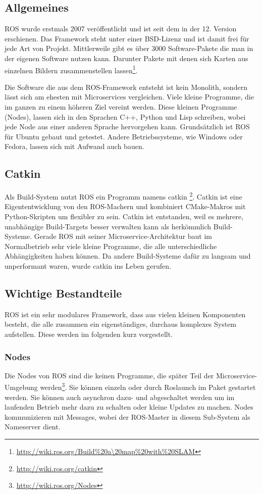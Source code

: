 \subsection{Allgemeines}

ROS wurde erstmals 2007 veröffentlicht und ist seit dem in der 12. Version erschienen. Das Framework steht unter einer BSD-Lizenz und ist damit frei für jede Art von Projekt. Mittlerweile gibt es über 3000 Software-Pakete die man in der eigenen Software nutzen kann. Darunter Pakete mit denen sich Karten aus einzelnen Bildern zusammenstellen lassen\footnote{\url{http://wiki.ros.org/Build\%20a\20map\%20with\%20SLAM}}.

Die Software die aus dem ROS-Framework entsteht ist kein Monolith, sondern lässt sich am ehesten mit Microservices vergleichen. Viele kleine Programme, die im ganzen zu einem höheren Ziel vereint werden. Diese kleinen Programme (Nodes), lassen sich in den Sprachen C++, Python und Lisp schreiben, wobei jede Node aus einer anderen Sprache hervorgehen kann. Grundsätzlich ist ROS für Ubuntu gebaut und getestet. Andere Betriebssysteme, wie Windows oder Fedora, lassen sich mit Aufwand auch bauen.

\subsection*{Catkin}

Als Build-System nutzt ROS ein Programm namens catkin \footnote{\url{http://wiki.ros.org/catkin}}. Catkin ist eine Eigententwicklung von den ROS-Machern und kombiniert CMake-Makros mit Python-Skripten um flexibler zu sein. Catkin ist entstanden, weil es mehrere, unabhängige Build-Targets besser verwalten kann als herkömmlich Build-Systeme. Gerade ROS mit seiner Microservice-Architektur baut im Normalbetrieb sehr viele kleine Programme, die alle unterschiedliche Abhängigkeiten haben können. Da andere Build-Systeme dafür zu langsam und unperformant waren, wurde catkin ins Leben gerufen.

\subsection*{Wichtige Bestandteile}

ROS ist ein sehr modulares Framework, dass aus vielen kleinen Komponenten besteht, die alle zusammen ein eigenständiges, durchaus komplexes System aufstellen. Diese werden im folgenden kurz vorgestellt.

\subsubsection*{Nodes}
Die Nodes von ROS sind die keinen Programme, die später Teil der Microservice-Umgebung werden\footnote{\url{http://wiki.ros.org/Nodes}}. Sie können einzeln oder durch Roslaunch im Paket gestartet werden. Sie können auch asynchron dazu- und abgeschaltet werden um im laufenden Betrieb mehr dazu zu schalten oder kleine Updates zu machen. Nodes kommunizieren mit Messages, wobei der ROS-Master in diesem Sub-System als Nameserver dient.

